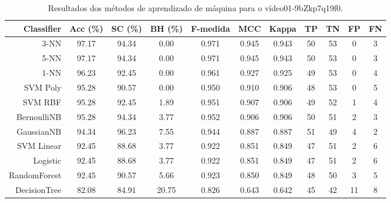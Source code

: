 \begin{table}[!htb]
\centering
\caption{Resultados dos métodos de aprendizado de máquina para o vídeo01-9bZkp7q19f0.}
\label{tab:01-9bZkp7q19f0}
\begin{tabular}{r|c|c|c|c|c|c|c|c|c|c}
\hline\hline
Classifier & Acc (\%) & SC (\%) & BH (\%) & F-medida & MCC & Kappa & TP & TN & FP & FN \\ \hline
3-NN & 97.17 & 94.34 & 0.00 & 0.971 & 0.945 & 0.943 & 50 & 53 & 0 & 3 \\ 
5-NN & 97.17 & 94.34 & 0.00 & 0.971 & 0.945 & 0.943 & 50 & 53 & 0 & 3 \\ 
1-NN & 96.23 & 92.45 & 0.00 & 0.961 & 0.927 & 0.925 & 49 & 53 & 0 & 4 \\ 
SVM Poly & 95.28 & 90.57 & 0.00 & 0.950 & 0.910 & 0.906 & 48 & 53 & 0 & 5 \\ 
SVM RBF & 95.28 & 92.45 & 1.89 & 0.951 & 0.907 & 0.906 & 49 & 52 & 1 & 4 \\ 
BernoulliNB & 95.28 & 94.34 & 3.77 & 0.952 & 0.906 & 0.906 & 50 & 51 & 2 & 3 \\ 
GaussianNB & 94.34 & 96.23 & 7.55 & 0.944 & 0.887 & 0.887 & 51 & 49 & 4 & 2 \\ 
SVM Linear & 92.45 & 88.68 & 3.77 & 0.922 & 0.851 & 0.849 & 47 & 51 & 2 & 6 \\ 
Logistic & 92.45 & 88.68 & 3.77 & 0.922 & 0.851 & 0.849 & 47 & 51 & 2 & 6 \\ 
RandomForest & 92.45 & 90.57 & 5.66 & 0.923 & 0.850 & 0.849 & 48 & 50 & 3 & 5 \\ 
DecisionTree & 82.08 & 84.91 & 20.75 & 0.826 & 0.643 & 0.642 & 45 & 42 & 11 & 8 \\ 
\hline\hline
\end{tabular}
\end{table}
